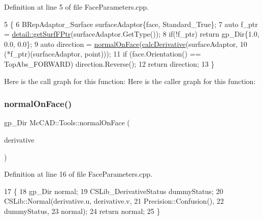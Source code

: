 Definition at line 5 of file Face\+Parameters.\+cpp.


\begin{DoxyCode}
5                                                                     \{
6     BRepAdaptor\_Surface surfaceAdaptor\{face, Standard\_True\};
7     \textcolor{keyword}{auto} f\_ptr = \hyperlink{namespaceMcCAD_1_1Tools_1_1detail_a119ac0e14da83e25dcc976a37b4e7f3f}{detail::getSurfFPtr}(surfaceAdaptor.GetType());
8     \textcolor{keywordflow}{if}(!f\_ptr) \textcolor{keywordflow}{return} gp\_Dir\{1.0, 0.0, 0.0\};
9     \textcolor{keyword}{auto} direction = \hyperlink{namespaceMcCAD_1_1Tools_a5e0090a8dd0489c030624ee30a098110}{normalOnFace}(\hyperlink{namespaceMcCAD_1_1Tools_a4bc929678a434c45096f3816af9143ad}{calcDerivative}(surfaceAdaptor,
10                                                  (*f\_ptr)(surfaceAdaptor, point)));
11     \textcolor{keywordflow}{if} (face.Orientation() == TopAbs\_FORWARD) direction.Reverse();
12     \textcolor{keywordflow}{return} direction;
13 \}
\end{DoxyCode}
Here is the call graph for this function\+:
Here is the caller graph for this function\+:
\mbox{\label{namespaceMcCAD_1_1Tools_ab4303c5e4df844f0195928903b3819f4}} 
\subsubsection{\texorpdfstring{normal\+On\+Face()}{normalOnFace()}\hspace{0.1cm}{\footnotesize\ttfamily [2/2]}}
{\footnotesize\ttfamily gp\+\_\+\+Dir Mc\+C\+A\+D\+::\+Tools\+::normal\+On\+Face (\begin{DoxyParamCaption}\item[{const \hyperlink{structMcCAD_1_1Tools_1_1DerivativeUV}{Derivative\+UV} \&}]{derivative }\end{DoxyParamCaption})}



Definition at line 16 of file Face\+Parameters.\+cpp.


\begin{DoxyCode}
17                                        \{
18     gp\_Dir normal;
19     CSLib\_DerivativeStatus dummyStatus;
20     CSLib::Normal(derivative.u, derivative.v,
21                   Precision::Confusion(),
22                   dummyStatus,
23                   normal);
24     \textcolor{keywordflow}{return} normal;
25 \}
\end{DoxyCode}
\mbox{\label{namespaceMcCAD_1_1Tools_a2c3c43d2878c73f69424e7b32f87bb2b}} 
